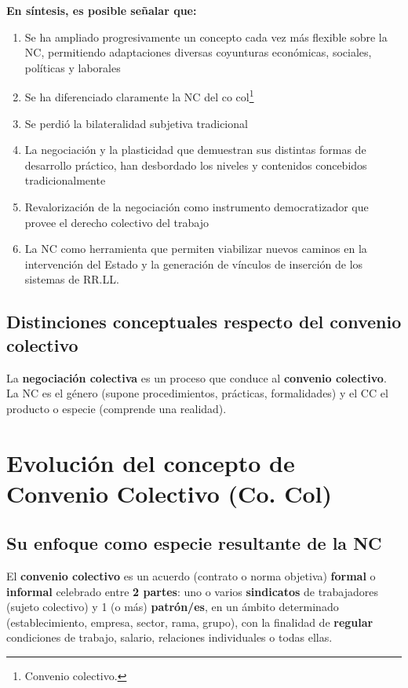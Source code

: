 \documentclass[spanish,12pt,a4paper,titlepage]{report}
\begin{document}
\textbf{En síntesis, es posible señalar que:}
\begin{enumerate}
	\item Se ha ampliado progresivamente un concepto cada vez más flexible sobre la NC, permitiendo adaptaciones diversas coyunturas económicas, sociales, políticas y laborales
	\item Se ha diferenciado claramente la NC del co col\footnote{Convenio colectivo.}
	\item Se perdió la bilateralidad subjetiva tradicional
	\item La negociación y la plasticidad que demuestran sus distintas formas de desarrollo práctico,  han desbordado los niveles y contenidos concebidos tradicionalmente
	\item Revalorización de la negociación como instrumento democratizador que provee el derecho colectivo del trabajo
	\item La NC como herramienta que permiten viabilizar nuevos caminos en la intervención del Estado y la generación de vínculos de inserción de los sistemas de RR.LL.
\end{enumerate}

\subsection{Distinciones conceptuales respecto del convenio colectivo}
La \textbf{negociación colectiva} es un proceso que conduce al \textbf{convenio colectivo}. La NC es el género (supone procedimientos, prácticas, formalidades) y el CC el producto o especie (comprende una realidad).

\section{Evolución del concepto de Convenio Colectivo (Co. Col)}
\subsection{Su enfoque como especie resultante de la NC}
El \textbf{convenio colectivo} es un acuerdo (contrato o norma objetiva) \textbf{formal} o \textbf{informal} celebrado entre \textbf{2 partes}: uno o varios \textbf{sindicatos} de trabajadores (sujeto colectivo) y 1 (o más) \textbf{patrón/es}, en un ámbito determinado (establecimiento, empresa, sector, rama, grupo), con la finalidad de \textbf{regular} condiciones de trabajo, salario, relaciones individuales o todas ellas.
\end{document}
